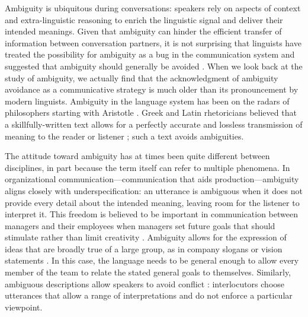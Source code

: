 \documentclass[11pt,a4paper]{article}
\begin{document}
%
Ambiguity is ubiquitous during conversations: speakers rely on aspects of context and extra-linguistic reasoning to enrich the linguistic signal and deliver their intended meanings. Given that ambiguity can hinder the efficient transfer of information between conversation partners, it is not surprising that linguists have treated the possibility for ambiguity as a bug in the communication system \cite{chomsky2002minimalism} and suggested that ambiguity should generally be avoided \cite{grice1975}.
When we look back at the study of ambiguity, we actually find that the acknowledgment of ambiguity avoidance as a communicative strategy is much older than its pronouncement by modern linguists.
Ambiguity in the language system has been on the radars of philosophers starting with Aristotle \cite{sennet2016ambiguity}. 
Greek and Latin rhetoricians believed that a skillfully-written text allows for a perfectly accurate and lossless transmission of meaning to the reader or listener \cite{ossarichardson2019}; such a text avoids ambiguities.

The attitude toward ambiguity has at times been quite different between disciplines, in part because the term itself can refer to multiple phenomena.
In organizational communication---communication that aids production---ambiguity aligns closely with underspecification: an utterance is ambiguous when it does not provide every detail about the intended meaning, leaving room for the listener to interpret it.
This freedom is believed to be important in communication between managers and their employees when managers set future goals that should stimulate rather than limit creativity \cite{mohr1983implications}.
Ambiguity allows for the expression of ideas that are broadly true of a large group, as in company slogans or vision statements \cite{carmon2013}. 
In this case, the language needs to be general enough to allow every member of the team to relate the stated general goals to themselves.
Similarly, ambiguous descriptions allow speakers to avoid conflict \cite{pascale1981art}:
interlocutors choose utterances that allow a range of interpretations and do not enforce a particular viewpoint. 
\end{document}

